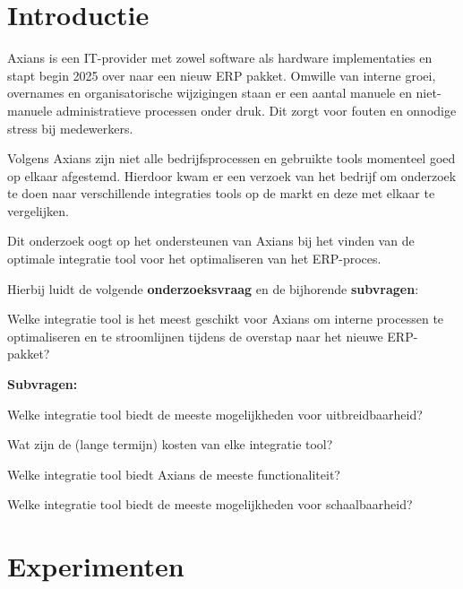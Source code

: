 \documentclass[a0,portrait]{hogent-poster}
\begin{document}
\begin{multicols}{2} %

\section{Introductie}

Axians is een IT-provider met zowel software als hardware implementaties en stapt begin 2025 over naar een nieuw ERP pakket. Omwille van interne groei, overnames en organisatorische wijzigingen staan er een aantal manuele en niet-manuele administratieve processen onder druk. Dit zorgt voor fouten en onnodige stress bij medewerkers. 
\vspace{\baselineskip}

Volgens Axians zijn niet alle bedrijfsprocessen en gebruikte tools momenteel goed op elkaar afgestemd. Hierdoor kwam er een verzoek van het bedrijf om onderzoek te doen naar verschillende integraties tools op de markt en deze met elkaar te vergelijken. 
\vspace{\baselineskip}

Dit onderzoek oogt op het ondersteunen van Axians bij het vinden van de optimale integratie tool voor het optimaliseren van het ERP-proces.

\vspace{\baselineskip}

Hierbij luidt de volgende \textbf{onderzoeksvraag} en de bijhorende \textbf{subvragen}:

\vspace{\baselineskip}

Welke integratie tool is het meest geschikt voor Axians om interne processen te optimaliseren en te stroomlijnen tijdens de overstap naar het nieuwe ERP-pakket?

\vspace{\baselineskip}

\textbf{Subvragen:}

Welke integratie tool biedt de meeste mogelijkheden voor uitbreidbaarheid?

Wat zijn de (lange termijn) kosten van elke integratie tool?

Welke integratie tool biedt Axians de meeste functionaliteit?

Welke integratie tool biedt de meeste mogelijkheden voor schaalbaarheid?


\section{Experimenten}


\end{multicols}
\end{document}
